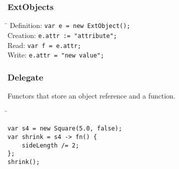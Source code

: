 \documentclass[paper=A4,paper=landscape,pagesize,9pt,DIV=30]{scrartcl}
\begin{document}
\begin{multicols}{3}
\subsubsection*{ExtObjects}
\begin{tabbing}
\hspace{1.75cm}\=\kill
Definition: \>\lstinline!var e = new ExtObject();! \\
Creation:	\>\lstinline!e.attr := "attribute";! \\
Read:		\>\lstinline!var f = e.attr;! \\
Write:		\>\lstinline!e.attr = "new value";!
\end{tabbing}
\subsubsection*{Delegate}
Functors that store an object reference and a function.
\begin{tabbing}
\hspace{1.75cm}\=\kill
\>\begin{lstlisting}
var s4 = new Square(5.0, false);
var shrink = s4 -> fn() {
	sideLength /= 2;
};
shrink();
\end{lstlisting}
\end{tabbing}

\end{multicols}
\end{document}
